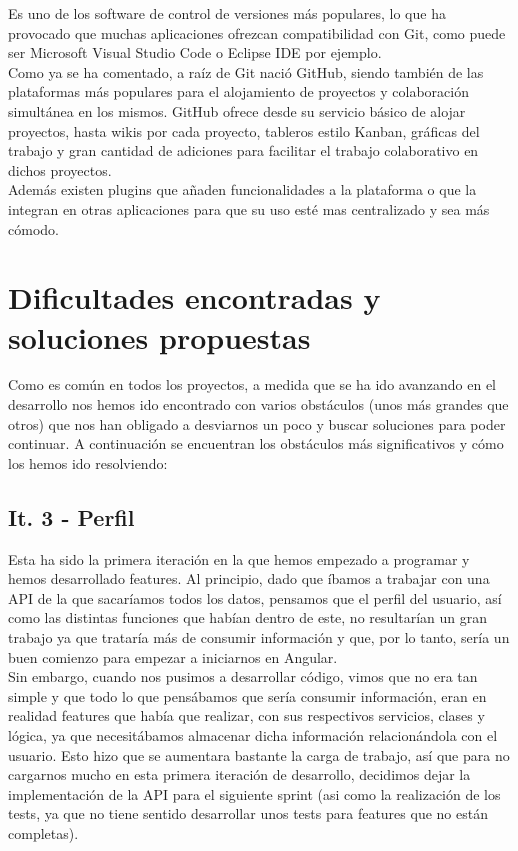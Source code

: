 Es uno de los software de control de versiones más populares, lo que ha provocado que muchas aplicaciones ofrezcan compatibilidad con Git, como puede ser Microsoft Visual Studio Code o Eclipse IDE por ejemplo.\\

Como ya se ha comentado, a raíz de Git nació GitHub, siendo también de las plataformas más populares para el alojamiento de proyectos y colaboración simultánea en los mismos. GitHub ofrece desde su servicio básico de alojar proyectos, hasta wikis por cada proyecto, tableros estilo Kanban, gráficas del trabajo y gran cantidad de adiciones para facilitar el trabajo colaborativo en dichos proyectos.\\

Además existen plugins que añaden funcionalidades a la plataforma o que la integran en otras aplicaciones para que su uso esté mas centralizado y sea más cómodo.\\

\clearpage

\section{Dificultades encontradas y soluciones propuestas}

Como es común en todos los proyectos, a medida que se ha ido avanzando en el desarrollo nos hemos ido encontrado con varios obstáculos (unos más grandes que otros) que nos han obligado a desviarnos un poco y buscar soluciones para poder continuar. A continuación se encuentran los obstáculos más significativos y cómo los hemos ido resolviendo:

\subsection{It. 3 - Perfil}

Esta ha sido la primera iteración en la que hemos empezado a programar y hemos desarrollado features. Al principio, dado que íbamos a trabajar con una API \citep{acnhapi} de la que sacaríamos todos los datos, pensamos que el perfil del usuario, así como las distintas funciones que habían dentro de este, no resultarían un gran trabajo ya que trataría más de consumir información y que, por lo tanto, sería un buen comienzo para empezar a iniciarnos en Angular.\\

Sin embargo, cuando nos pusimos a desarrollar código, vimos que no era tan simple y que todo lo que pensábamos que sería consumir información, eran en realidad features que había que realizar, con sus respectivos servicios, clases y lógica, ya que necesitábamos almacenar dicha información relacionándola con el usuario. Esto hizo que se aumentara bastante la carga de trabajo, así que para no cargarnos mucho en esta primera iteración de desarrollo, decidimos dejar la implementación de la API para el siguiente sprint (asi como la realización de los tests, ya que no tiene sentido desarrollar unos tests para features que no están completas).\\

